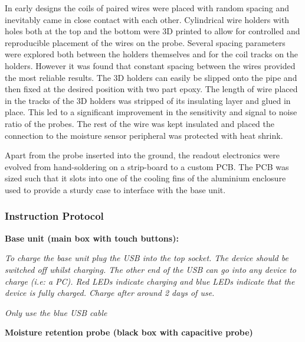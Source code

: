 In early designs the coils of paired wires were placed with random spacing and inevitably came in close contact with each other. Cylindrical wire holders with holes both at the top and the bottom were 3D printed to allow for controlled and reproducible placement of the wires on the probe. Several spacing parameters were explored both between the holders themselves and for the coil tracks on the holders. However it was found that constant spacing between the wires provided the most reliable results. The 3D holders can easily be slipped onto the pipe and then fixed at the desired position with two part epoxy. The length of wire placed in the tracks of the 3D holders was stripped of its insulating layer and glued in place. This led to a significant improvement in the sensitivity and signal to noise ratio of the probes. The rest of the wire was kept insulated and placed the connection to the moisture sensor peripheral was protected with heat shrink. 


Apart from the probe inserted into the ground, the readout electronics were evolved from hand-soldering on a strip-board to a custom PCB. The PCB was sized such that it slots into one of the cooling fins of the aluminium enclosure used to provide a sturdy case to interface with the base unit.

\subsubsection{Instruction Protocol}
\label{smrinstructionprotocol}

\textbf{Base unit (main box with touch buttons):  }

\textit{To charge the base unit plug the USB into the top socket. The device should be switched off whilst charging. The other end of the USB can go into any device to charge  (i.e: a PC). Red LEDs indicate charging and blue LEDs indicate that the device is fully charged. Charge after around 2 days of use.} 

\textit{Only use the blue USB cable}  


\textbf{Moisture retention probe (black box with capacitive probe)} 

